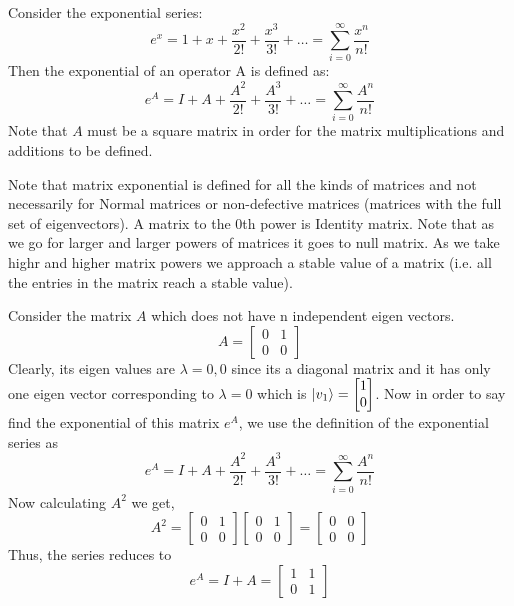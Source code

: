 \begin{example}
    Consider the exponential series:
    \[ e^x=1+x+\dfrac{x^2}{2!}+\dfrac{x^3}{3!}+\ldots = \sum_{i=0}^{\infty} \dfrac{x^n}{n!}\]
    Then the exponential of an operator A is defined as:
    \[ e^A=I+A+\dfrac{A^2}{2!}+\dfrac{A^3}{3!}+\ldots = \sum_{i=0}^{\infty} \dfrac{A^n}{n!}\]
    Note that $A$ must be a square matrix in order for the matrix multiplications and additions to be defined.
\end{example}
Note that matrix exponential is defined for all the kinds of matrices and not necessarily for Normal matrices or non-defective matrices (matrices with the full set of eigenvectors). A matrix to the 0th power is Identity matrix. Note that as we go for larger and larger powers of matrices it goes to null matrix. As we take highr and higher matrix powers we approach a stable value of a matrix (i.e. all the entries in the matrix reach a stable value).
\begin{example}
    Consider the matrix $A$ which does not have n independent eigen vectors.
    \[
    A=\begin{bmatrix} 0 & 1 \\ 0 & 0 \end{bmatrix} 
    \]
    Clearly, its eigen values are $\lambda=0,0$ since its a diagonal matrix and it has only one eigen vector corresponding to $\lambda=0$ which is $\ket{v_1}=\begin{bmatrix} 1 \\ 0 \end{bmatrix}$. Now in order to say find the exponential of this matrix $e^A$, we use the definition of the exponential series as
    \[
    e^A=I+A+\dfrac{A^2}{2!}+\dfrac{A^3}{3!}+\ldots = \sum_{i=0}^{\infty} \dfrac{A^n}{n!}
    \]
    Now calculating $A^2$ we get,
    \[
    A^2=\begin{bmatrix} 0 & 1 \\ 0 & 0 \end{bmatrix}\begin{bmatrix} 0 & 1 \\ 0 & 0 \end{bmatrix}=\begin{bmatrix} 0 & 0 \\ 0 & 0 \end{bmatrix}
    \]
    Thus, the series reduces to
    \[
    e^A=I+A=\begin{bmatrix} 1 & 1 \\ 0 & 1 \end{bmatrix}
    \]
\end{example}
